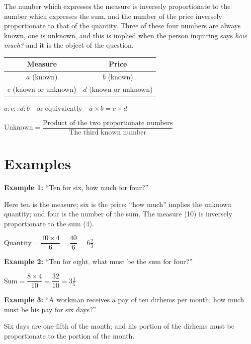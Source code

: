 \documentclass[11pt,a4paper]{book}
\begin{document}
The number which expresses the measure is inversely proportionate to the
number which expresses the sum, and the number of the price inversely
proportionate to that of the quantity. Three of these four numbers are
always known, one is unknown, and this is implied when the person inquiring
says \textit{how much?} and it is the object of the question.

\begin{mathbox}[title={\textbf{The Rule of Four Numbers}}]
\begin{center}
\begin{tabular}{c|c}
\textbf{Measure} & \textbf{Price} \\
\hline
$a$ (known) & $b$ (known) \\
$c$ (known or unknown) & $d$ (known or unknown) \\
\end{tabular}

\vspace{0.3cm}

$a : c :: d : b \quad\text{or equivalently}\quad a \times b = c \times d$

$\text{Unknown} = \dfrac{\text{Product of the two proportionate numbers}}{\text{The third known number}}$
\end{center}
\end{mathbox}

\section*{Examples}

\textbf{Example 1:} ``Ten for six, how much for four?''

Here ten is the measure; six is the price; ``how much'' implies the unknown
quantity; and four is the number of the sum. The measure (10) is inversely
proportionate to the sum (4).

$\text{Quantity} = \dfrac{10 \times 4}{6} = \dfrac{40}{6} = 6\tfrac{2}{3}$

\textbf{Example 2:} ``Ten for eight, what must be the sum for four?''

$\text{Sum} = \dfrac{8 \times 4}{10} = \dfrac{32}{10} = 3\tfrac{1}{5}$

\textbf{Example 3:} ``A workman receives a pay of ten dirhems per month;
how much must be his pay for six days?''

Six days are one-fifth of the month; and his portion of the dirhems must be
proportionate to the portion of the month.
\end{document}
